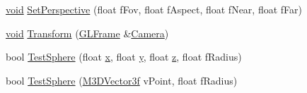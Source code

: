 \begin{DoxyCompactItemize}
\item 
\hyperlink{_s_d_l__opengl_8h_a3db05964a3cc4410f35b7ea2b7eb850d}{void} \hyperlink{class_g_l_frustum_aac9ef555d4e1bce74bb8ee534418eaec}{Set\-Perspective} (float f\-Fov, float f\-Aspect, float f\-Near, float f\-Far)
\item 
\hyperlink{_s_d_l__opengl_8h_a3db05964a3cc4410f35b7ea2b7eb850d}{void} \hyperlink{class_g_l_frustum_aec742ccf2bc2d1986d3ccacec2fe51c6}{Transform} (\hyperlink{class_g_l_frame}{G\-L\-Frame} \&\hyperlink{class_camera}{Camera})
\item 
bool \hyperlink{class_g_l_frustum_ae25c4a6296b5ad2308914d65cee8020c}{Test\-Sphere} (float \hyperlink{_g_l_e_w_2glew_8h_a0cdec8e97a75ee9458b23d152bf962d4}{x}, float \hyperlink{_g_l_e_w_2glew_8h_a74d80fd479c0f6d0153c709949a089ef}{y}, float \hyperlink{_g_l_e_w_2glew_8h_aee38b51639b577753f6a92029fb92000}{z}, float f\-Radius)
\item 
bool \hyperlink{class_g_l_frustum_ad4587d26fc972a7d405d38cbeddb60ae}{Test\-Sphere} (\hyperlink{math3d_8h_a2163fe22bd4208b846d22ec7e74cf858}{M3\-D\-Vector3f} v\-Point, float f\-Radius)
\end{DoxyCompactItemize}
